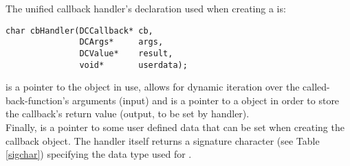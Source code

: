 The unified callback handler's declaration used when creating a 
is:

\begin{lstlisting}
char cbHandler(DCCallback* cb,
               DCArgs*     args,
               DCValue*    result,
               void*       userdata);
\end{lstlisting}

 is a pointer to the  object in use,  allows
for dynamic iteration over the called-back-function's arguments (input) and
 is a pointer to a  object in order to store the
callback's return value (output, to be set by handler).\\
Finally,  is a pointer to some user defined data that can be
set when creating the callback object.
The handler itself returns a signature character (see Table \ref{sigchar}) specifying the
data type used for .

